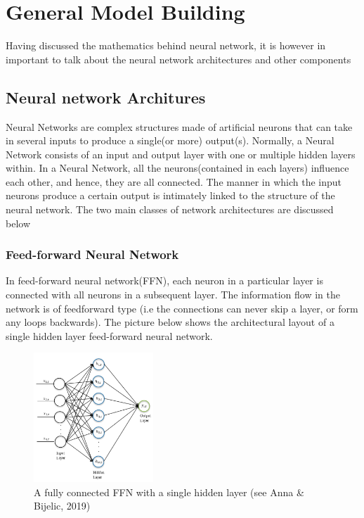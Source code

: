 \documentclass[a4paper,11pt,oneside]{book}
\begin{document}
 \section{General Model Building}
 Having discussed the mathematics behind neural network, it is however in important to talk about the neural network architectures and other components
 \subsection{Neural network Architures}
 Neural Networks are complex structures made of artificial neurons that can take in several inputs to produce a single(or more) output(s). Normally, a Neural Network consists of an input and output layer with one or multiple hidden layers within. In a Neural Network, all the neurons(contained in each layers) influence each other, and hence, they are all connected. The manner in which the input neurons produce a certain output is intimately linked
 to the structure of the neural network. The two main classes of network architectures are discussed below
 \subsubsection{Feed-forward Neural Network}
 In feed-forward neural network(FFN), each neuron in a
 particular layer is connected with all neurons in a subsequent layer. The information
 flow in the network is of feedforward type (i.e the connections
 can never skip a layer, or form any loops backwards). The picture below shows the architectural layout of a single hidden layer feed-forward neural network.\newline\newline\newline\newline
 \begin{figure}
 	\centering
 	\includegraphics[width=0.4\textwidth]{figures/FFN}
 	\caption{A fully connected FFN with a single hidden layer (see Anna \& Bijelic, 2019)}
 	
 	\label{sixthfig}
 \end{figure}
 
\end{document}

